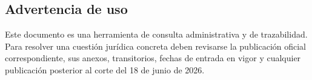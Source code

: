\documentclass{institucional}
\begin{document}
\subsection{Advertencia de uso}

Este documento es una herramienta de consulta administrativa y de trazabilidad. Para resolver una cuestión jurídica concreta deben revisarse la publicación oficial correspondiente, sus anexos, transitorios, fechas de entrada en vigor y cualquier publicación posterior al corte del 18 de junio de 2026.

\SENERContraportada
\end{document}

